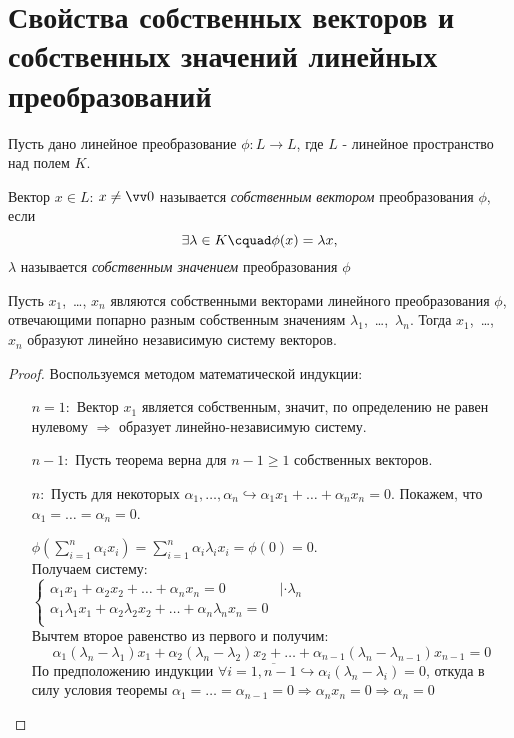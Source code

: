 \section{Свойства собственных векторов и собственных значений линейных преобразований}
Пусть дано линейное преобразование $\phi\colon L \rightarrow L$, где $L$ - линейное пространство над полем $K$.
\begin{defn}
Вектор $x \in L$: $x \neq \vv 0$ называется \textit{собственным вектором} преобразования $\phi$, если 
\begin{equation}
\exists \lambda \in K\cquad \phi(x)=\lambda x,
\end{equation}
$\lambda$ называется \textit{собственным значением} преобразования $\phi$ 
\end{defn}
\begin{thm}
Пусть $x_1$,~\ldots, $x_n$ являются собственными векторами линейного преобразования $\phi$, отвечающими попарно разным собственным значениям $\lambda_1$,~\ldots,~$\lambda_n$. Тогда $x_1$,~\ldots, $x_n$ образуют линейно независимую систему векторов.
\end{thm}
\begin{proof}
Воспользуемся методом математической индукции:
\linebreak\vspace*{-\baselineskip}
\begin{itemize}
\item[\underline{$n=1:$}] Вектор $x_1$ является собственным, значит, по определению не равен нулевому $\Rightarrow$ образует линейно-независимую систему.
\item[\underline{$n-1:$}] Пусть теорема верна для $n-1\ge 1$ собственных векторов.

\item[\underline{$n:$}] Пусть для некоторых $\alpha_1,\dots,\alpha_n \hookrightarrow \alpha_1 x_1 + \ldots+\alpha_n x_n = 0$. Покажем, что $\alpha_1=\ldots=\alpha_n=0$.

$\phi(\sum_{i=1}^n \alpha_i x_i)=\sum_{i=1}^n \alpha_i \lambda_i x_i = \phi(0)=0$. \\
Получаем систему: \\
$\begin{cases}
\alpha_1 x_1 + \alpha_2 x_2 + \ldots + \alpha_n x_n = 0 & |\cdot \lambda_n \\
\alpha_1 \lambda_1 x_1 + \alpha_2 \lambda_2 x_2 + \ldots + \alpha_n \lambda_n x_n = 0 \\
\end{cases}$ \\
Вычтем второе равенство из первого и получим:
\begin{equation*}
\alpha_1 (\lambda_n-\lambda_1) x_1 + \alpha_2 (\lambda_n-\lambda_2) x_2 + \ldots + \alpha_{n-1} (\lambda_n-\lambda_{n-1}) x_{n-1} = 0
\end{equation*}
По предположению индукции $\forall i=\overline{1,n-1} \hookrightarrow \alpha_i(\lambda_n-\lambda_i)=0$, откуда в силу условия теоремы $\alpha_1=\ldots=\alpha_{n-1}=0 \Rightarrow \alpha_n x_n=0 \Rightarrow \alpha_n=0$
\end{itemize}
\vspace{-1.65\baselineskip}
\end{proof}
